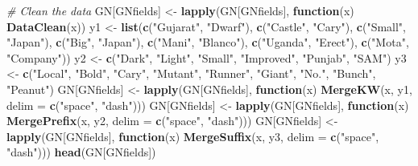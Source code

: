 \documentclass[
]{article}
\newenvironment{Shaded}{\begin{snugshade}}{\end{snugshade}}
\newcommand{\CommentTok}[1]{\textcolor[rgb]{0.56,0.35,0.01}{\textit{#1}}}
\newcommand{\ControlFlowTok}[1]{\textcolor[rgb]{0.13,0.29,0.53}{\textbf{#1}}}
\newcommand{\DataTypeTok}[1]{\textcolor[rgb]{0.13,0.29,0.53}{#1}}
\newcommand{\KeywordTok}[1]{\textcolor[rgb]{0.13,0.29,0.53}{\textbf{#1}}}
\newcommand{\NormalTok}[1]{#1}
\newcommand{\StringTok}[1]{\textcolor[rgb]{0.31,0.60,0.02}{#1}}
\begin{document}
\begin{Shaded}
\begin{Highlighting}[]
\CommentTok{# Clean the data}
\NormalTok{GN[GNfields] <-}\StringTok{ }\KeywordTok{lapply}\NormalTok{(GN[GNfields], }\ControlFlowTok{function}\NormalTok{(x) }\KeywordTok{DataClean}\NormalTok{(x))}
\NormalTok{y1 <-}\StringTok{ }\KeywordTok{list}\NormalTok{(}\KeywordTok{c}\NormalTok{(}\StringTok{"Gujarat"}\NormalTok{, }\StringTok{"Dwarf"}\NormalTok{), }\KeywordTok{c}\NormalTok{(}\StringTok{"Castle"}\NormalTok{, }\StringTok{"Cary"}\NormalTok{), }\KeywordTok{c}\NormalTok{(}\StringTok{"Small"}\NormalTok{, }\StringTok{"Japan"}\NormalTok{),}
\KeywordTok{c}\NormalTok{(}\StringTok{"Big"}\NormalTok{, }\StringTok{"Japan"}\NormalTok{), }\KeywordTok{c}\NormalTok{(}\StringTok{"Mani"}\NormalTok{, }\StringTok{"Blanco"}\NormalTok{), }\KeywordTok{c}\NormalTok{(}\StringTok{"Uganda"}\NormalTok{, }\StringTok{"Erect"}\NormalTok{),}
\KeywordTok{c}\NormalTok{(}\StringTok{"Mota"}\NormalTok{, }\StringTok{"Company"}\NormalTok{))}
\NormalTok{y2 <-}\StringTok{ }\KeywordTok{c}\NormalTok{(}\StringTok{"Dark"}\NormalTok{, }\StringTok{"Light"}\NormalTok{, }\StringTok{"Small"}\NormalTok{, }\StringTok{"Improved"}\NormalTok{, }\StringTok{"Punjab"}\NormalTok{, }\StringTok{"SAM"}\NormalTok{)}
\NormalTok{y3 <-}\StringTok{ }\KeywordTok{c}\NormalTok{(}\StringTok{"Local"}\NormalTok{, }\StringTok{"Bold"}\NormalTok{, }\StringTok{"Cary"}\NormalTok{, }\StringTok{"Mutant"}\NormalTok{, }\StringTok{"Runner"}\NormalTok{, }\StringTok{"Giant"}\NormalTok{, }\StringTok{"No."}\NormalTok{,}
        \StringTok{"Bunch"}\NormalTok{, }\StringTok{"Peanut"}\NormalTok{)}
\NormalTok{GN[GNfields] <-}\StringTok{ }\KeywordTok{lapply}\NormalTok{(GN[GNfields],}
                       \ControlFlowTok{function}\NormalTok{(x) }\KeywordTok{MergeKW}\NormalTok{(x, y1, }\DataTypeTok{delim =} \KeywordTok{c}\NormalTok{(}\StringTok{"space"}\NormalTok{, }\StringTok{"dash"}\NormalTok{)))}
\NormalTok{GN[GNfields] <-}\StringTok{ }\KeywordTok{lapply}\NormalTok{(GN[GNfields],}
                       \ControlFlowTok{function}\NormalTok{(x) }\KeywordTok{MergePrefix}\NormalTok{(x, y2, }\DataTypeTok{delim =} \KeywordTok{c}\NormalTok{(}\StringTok{"space"}\NormalTok{, }\StringTok{"dash"}\NormalTok{)))}
\NormalTok{GN[GNfields] <-}\StringTok{ }\KeywordTok{lapply}\NormalTok{(GN[GNfields],}
                       \ControlFlowTok{function}\NormalTok{(x) }\KeywordTok{MergeSuffix}\NormalTok{(x, y3, }\DataTypeTok{delim =} \KeywordTok{c}\NormalTok{(}\StringTok{"space"}\NormalTok{, }\StringTok{"dash"}\NormalTok{)))}
\KeywordTok{head}\NormalTok{(GN[GNfields])}
\end{Highlighting}
\end{Shaded}
\end{document}
